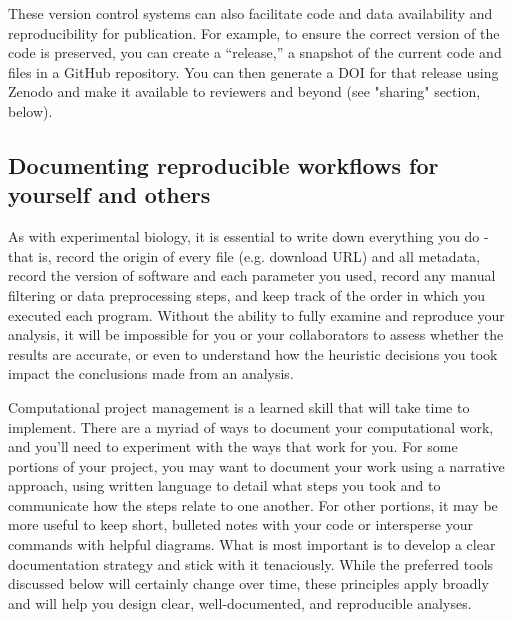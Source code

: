 \documentclass[10pt,letterpaper]{article}
\begin{document}
These version control systems can also facilitate code and data availability and reproducibility for publication. 
For example, to ensure the correct version of the code is preserved, you can create a “release,” a snapshot of the current code and files in a GitHub repository. 
You can then generate a DOI for that release using Zenodo and make it available to reviewers and beyond (see "sharing" section, below).



\subsection*{Documenting reproducible workflows for yourself and others}

As with experimental biology, it is essential to write down everything you do - that is, record the origin of every file (e.g. download URL) and all metadata, record the version of software and each parameter you used, record any manual filtering or data preprocessing steps, and keep track of the order in which you executed each program. 
Without the ability to fully examine and reproduce your analysis, it will be impossible for you or your collaborators to assess whether the results are accurate, or even to understand how the heuristic decisions you took impact the conclusions made from an analysis. 

Computational project management is a learned skill that will take time to implement. There are a myriad of ways to document your computational work, and you'll need to experiment with the ways that work for you. 
For some portions of your project, you may want to document your work using a narrative approach, using written language to detail what steps you took and to communicate how the steps relate to one another. 
For other portions, it may be more useful to keep short, bulleted notes with your code or intersperse your commands with helpful diagrams. 
What is most important is to develop a clear documentation strategy and stick with it tenaciously. 
While the preferred tools discussed below will certainly change over time, these principles apply broadly and will help you design clear, well-documented, and reproducible analyses.
\end{document}
